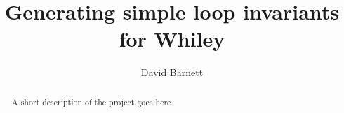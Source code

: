 \documentclass[11pt
              , a4paper
              , twoside
              , openright
              ]{report}
\title{Generating simple loop invariants for Whiley}
\author{David Barnett}
\date{}
\begin{document}
\frontmatter



\begin{abstract}

A short description of the project goes here.

\end{abstract}


\maketitle



\tableofcontents



\mainmatter












\backmatter



%


\end{document}
